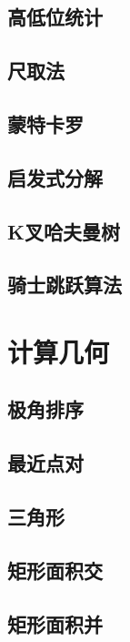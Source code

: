 \documentclass{article}
\begin{document}
\subsection{高低位统计} 

\subsection{尺取法} 

\subsection{蒙特卡罗} 

\subsection{启发式分解} 

\subsection{K叉哈夫曼树} 

\subsection{骑士跳跃算法} 



\newpage %
\section{计算几何} %
\subsection{极角排序} 

\subsection{最近点对} 

\subsection{三角形} 

\subsection{矩形面积交} 

\subsection{矩形面积并} 

\end{document}
